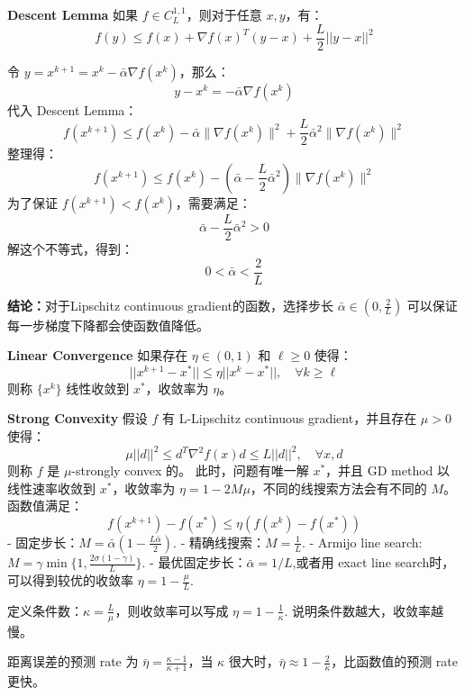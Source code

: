 \documentclass[11pt,a4paper]{article}
\begin{document}
\textbf{Descent Lemma} 如果 \(f \in C^{1,1}_L\)，则对于任意 \(x, y\)，有： \[f(y) \leq f(x) + \nabla f(x)^T (y - x) + \frac{L}{2} ||y - x||^2\]

令 \(y = x^{k+1} = x^k - \bar{\alpha} \nabla f(x^k)\)，那么： \[y - x^k = -\bar{\alpha} \nabla f(x^k)\] 代入 Descent Lemma： \[f(x^{k+1}) \leq f(x^k) - \bar{\alpha} \|\nabla f(x^k)\|^2 + \frac{L}{2} \bar{\alpha}^2 \|\nabla f(x^k)\|^2\] 整理得： \[f(x^{k+1}) \leq f(x^k) - \left(\bar{\alpha} - \frac{L}{2} \bar{\alpha}^2\right) \|\nabla f(x^k)\|^2\] 为了保证 \(f(x^{k+1}) < f(x^k)\)，需要满足： \[\bar{\alpha} - \frac{L}{2} \bar{\alpha}^2 > 0\] 解这个不等式，得到： \[0 < \bar{\alpha} < \frac{2}{L}\]

\textbf{结论：}对于Lipschitz continuous gradient的函数，选择步长 \(\bar{\alpha} \in (0, \frac{2}{L})\) 可以保证每一步梯度下降都会使函数值降低。

\textbf{Linear Convergence} 如果存在 \(\eta \in (0, 1)\) 和 \(\ell \geq 0\) 使得： \[||x^{k+1} - x^*|| \leq \eta ||x^k - x^*||, \quad \forall k \geq \ell\] 则称 \(\{x^k\}\) 线性收敛到 \(x^*\)，收敛率为 \(\eta\)。

\textbf{Strong Convexity} 假设 \(f\) 有 L-Lipschitz continuous gradient，并且存在 \(\mu > 0\) 使得： \[\mu ||d||^2 \leq d^T \nabla^2 f(x) d \leq L ||d||^2, \quad \forall x, d\] 则称 \(f\) 是 \(\mu\)-strongly convex 的。 此时，问题有唯一解 \(x^*\)，并且 GD method 以线性速率收敛到 \(x^*\)，收敛率为 \(\eta = 1 - 2M\mu\)，不同的线搜索方法会有不同的 \(M\)。 函数值满足： \[f(x^{k+1}) - f(x^*) \leq \eta (f(x^k) - f(x^*))\] - 固定步长：\(M = \bar{\alpha} (1 - \frac{L \bar{\alpha}}{2})\). - 精确线搜索：\(M = \frac{1}{L}\). - Armijo line search: \(M = \gamma \min\{1, \frac{2\sigma (1 - \gamma)}{L}\}\). - 最优固定步长：\(\bar{\alpha}= 1/L\),或者用 exact line search时，可以得到较优的收敛率 \(\eta = 1 - \frac{\mu}{L}\).

定义条件数：\(\kappa = \frac{L}{\mu}\)，则收敛率可以写成 \(\eta = 1 - \frac{1}{\kappa}\). 说明条件数越大，收敛率越慢。

距离误差的预测 rate 为 \(\bar{\eta} = \frac{\kappa - 1}{\kappa + 1}\)，当 \(\kappa\) 很大时，\(\bar{\eta} \approx 1 - \frac{2}{\kappa}\)，比函数值的预测 rate 更快。
\end{document}
